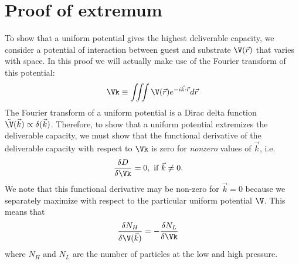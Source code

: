 \documentclass[twocolumn]{article}
\begin{document}
\section*{Proof of extremum}

To show that a uniform potential gives the highest deliverable capacity, we consider a potential of interaction between guest and substrate $\V(\vec r)$ that varies with space.  In this proof we will actually make use of the Fourier transform of this potential:
\begin{align}
    \Vk \equiv \iiint \V(\vec r) e^{-i\vec k\cdot \vec r} d\vec r
\end{align}
The Fourier transform of a uniform potential is a Dirac delta function $\tilde{\V}(\vec k)\propto\delta(\vec k)$. Therefore, to show that a uniform potential extremizes the deliverable capacity, we must show that the functional derivative of the deliverable capacity with respect to $\Vk$ is zero for \emph{nonzero} values of $\vec k$, i.e.
\begin{align}
    \frac{\delta D}{\delta \Vk} &= 0, \text{ if } \vec k\ne 0.
\end{align}
We note that this functional derivative may be non-zero for $\vec k=0$ because we separately maximize with respect to the particular uniform potential $\V$.
This means that
\begin{align}
    \frac{\delta N_H}{\delta \V(\vec k)} &= -\frac{\delta N_L}{\delta \Vk}
\end{align}
where $N_H$ and $N_L$ are the number of particles at the low and high pressure.
\end{document}

